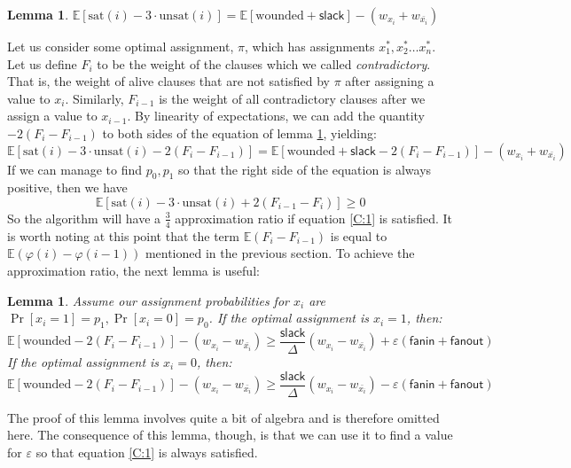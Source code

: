 \documentclass[11pt,letter]{article}
\newtheorem{lemma}[theorem]{Lemma}
\numberwithin{theorem}{section}
\renewcommand{\phi}{\varphi}
\begin{document}
\begin{lemma} \label{L:2}
$\mathbb{E}[\textrm{sat}(i) - 3\cdot\textrm{unsat}(i)] = \mathbb{E}[\textrm{wounded} + \mathsf{slack}] - (w_{x_i} + w_{\bar{x_i}})$
\end{lemma}
Let us consider some optimal assignment, $\pi$, which has assignments $x_1^*, x_2^* \ldots x_n^*$. Let us define $F_i$ to be the weight of the clauses which we called \emph{contradictory}. That is, the weight of alive clauses that are not satisfied by $\pi$ after assigning a value to $x_i$. Similarly, $F_{i-1}$ is the weight of all contradictory clauses  after we assign a value to $x_{i-1}$. By linearity of expectations, we can add the quantity $-2(F_{i}-F_{i-1})$ to both sides of the equation of lemma \ref{L:2}, yielding:
\begin{equation}
\mathbb{E}[\textrm{sat}(i) - 3\cdot\textrm{unsat}(i) - 2(F_{i}-F_{i-1})] = \mathbb{E}[\textrm{wounded} + \mathsf{slack} - 2(F_{i}-F_{i-1})] - (w_{x_i} + w_{\bar{x_i}})
\end{equation}
If we can manage to find $p_0,p_1$ so that the right side of the equation is always positive, then we have
\begin{equation}
\mathbb{E}[\textrm{sat}(i) - 3\cdot\textrm{unsat}(i)+ 2(F_{i-1}-F_i)] \ge 0 \label{C:1}
\end{equation}
So the algorithm will have a $\frac{3}{4}$ approximation ratio if equation \ref{C:1} is satisfied. It is worth noting at this 
point that the term $\mathbb{E}(F_{i}-F_{i-1})$ is equal to
$\mathbb{E}(\phi(i) - \phi(i-1))$ mentioned in the previous section. To achieve the approximation ratio, the next lemma is useful:
\begin{lemma} \label{L:3}
Assume our assignment probabilities for $x_i$ are $\Pr[x_i = 1] = p_1, \Pr[x_i =0] = p_0$. If the optimal assignment is $x_i =1$, then:
\[\mathbb{E}[\textrm{wounded} - 2(F_{i}-F_{i-1})] - (w_{x_i} - w_{\bar{x_i}}) \ge \frac{\mathsf{slack}}{\Delta}(w_{x_i} - w_{\bar{x_i}}) + \varepsilon(\mathsf{fanin} + \mathsf{fanout})\]
If the optimal assignment is  $x_i=0$, then:
\[\mathbb{E}[\textrm{wounded} - 2(F_{i}-F_{i-1})] - (w_{x_i} - w_{\bar{x_i}}) \ge \frac{\mathsf{slack}}{\Delta}(w_{x_i} - w_{\bar{x_i}}) - \varepsilon(\mathsf{fanin} + \mathsf{fanout})\]
\end{lemma}
The proof of this lemma involves quite a bit of algebra and is therefore omitted here. The consequence of this lemma, though, is that we can use it to find a value for $\varepsilon$ so that equation \ref{C:1} is always satisfied.
\end{document}
